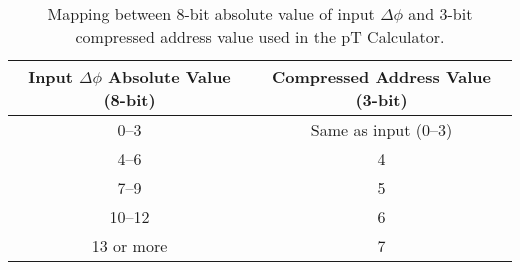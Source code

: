 \begin{table}[htbp]
  \centering
  \caption{Mapping between 8-bit absolute value of input \(\Delta\phi\) and 3-bit compressed address value used in the pT Calculator.}
  \label{tab:phi_encoding}
  \begin{tabular}{c|c}
    \hline
    Input \(\Delta\phi\) Absolute Value (8-bit) & Compressed Address Value (3-bit) \\
    \hline
    0--3     & Same as input (0--3) \\
    4--6     & 4 \\
    7--9     & 5 \\
    10--12   & 6 \\
    13 or more & 7 \\
    \hline
  \end{tabular}
\end{table}